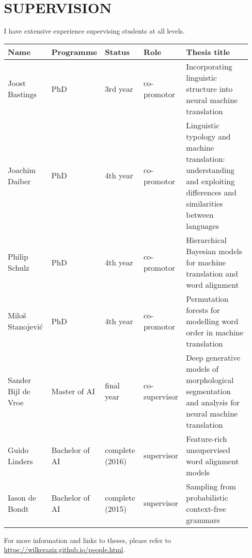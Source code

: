 
\section*{SUPERVISION}

I have extensive experience supervising students at all levels. 

\begin{tabular}{l l p{2cm} l p{6cm}}
\bf Name & \bf Programme & \bf Status & \bf Role & \bf Thesis title \\ \hline
Joost Bastings & PhD & 3rd year & co-promotor & Incorporating linguistic structure into neural machine translation \\
Joachim Daiber & PhD & 4th year & co-promotor & Linguistic typology and machine translation: understanding and exploiting differences and similarities between languages\\
Philip Schulz  & PhD & 4th year & co-promotor & Hierarchical Bayesian models for machine translation and word alignment \\
Milo\v{s} Stanojevi\'c & PhD & 4th year & co-promotor & Permutation forests for modelling word order in machine translation \\
Sander Bijl de Vroe & Master of AI & final year & co-supervisor & Deep generative models of morphological segmentation and analysis for neural machine translation\\
Guido Linders & Bachelor of AI & complete (2016) & supervisor & Feature-rich unsupervised word alignment models \\
Iason de Bondt & Bachelor of AI & complete (2015) & supervisor & Sampling from probabilistic context-free grammars\\ \hline
\end{tabular}
For more information and links to theses, please refer to \url{https://wilkeraziz.github.io/people.html}.






